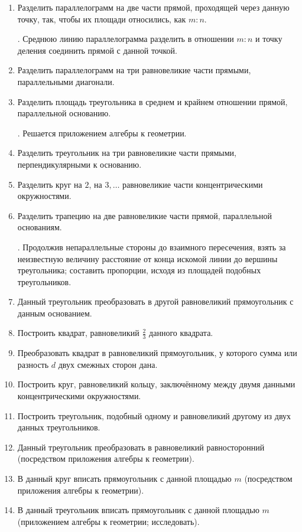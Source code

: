 \documentclass[oneside]{book}
\begin{document}
\begin{enumerate}[resume]
 \item
Разделить параллелограмм на две части прямой, проходящей через данную точку, так, чтобы их площади относились, как $m:n$.

\smallskip
{}.
Среднюю линию параллелограмма разделить в отношении $m:n$ и точку деления соединить прямой с данной точкой. %

 \item
Разделить параллелограмм на три равновеликие части прямыми, параллельными диагонали.

 \item
Разделить площадь треугольника в среднем и крайнем отношении прямой, параллельной основанию.

\smallskip
{}.
Решается приложением алгебры к геометрии.

 \item
Разделить треугольник на три равновеликие части прямыми, перпендикулярными к основанию.

 \item
Разделить круг на $2$, на $3,\dots$ равновеликие части концентрическими окружностями.

 \item
Разделить трапецию на две равновеликие части прямой, параллельной основаниям.

\smallskip
{}.
Продолжив непараллельные стороны до взаимного пересечения, взять за неизвестную величину расстояние от конца искомой линии до вершины треугольника;
составить пропорции, исходя из площадей подобных треугольников.

 \item
Данный треугольник преобразовать в другой равновеликий прямоугольник с данным основанием.

 \item
Построить квадрат, равновеликий $\tfrac23$ данного квадрата.

 \item
Преобразовать квадрат в равновеликий прямоугольник, у которого сумма или разность $d$ двух смежных сторон дана.

 \item
Построить круг, равновеликий кольцу, заключённому между двумя данными концентрическими окружностями.

 \item
Построить треугольник, подобный одному и равновеликий другому из двух данных треугольников.

 \item
Данный треугольник преобразовать в равновеликий равносторонний (посредством приложения алгебры к геометрии).

 \item
В данный круг вписать прямоугольник с данной площадью $m$ (посредством приложения алгебры к геометрии).

 \item
В данный треугольник вписать прямоугольник с данной площадью $m$ (приложением алгебры к геометрии; исследовать).

\end{enumerate}

{\scriptsize
\printindex
}


\tableofcontents


\end{document}
